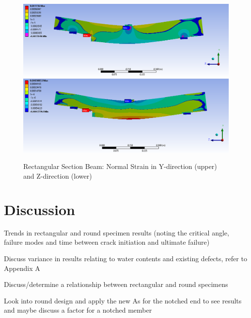 \documentclass[11pt,a4paper]{article}
\numberwithin{equation}{subsection}
\begin{document}
\begin{figure}[h]
	\begin{center}
		\includegraphics[scale=0.45]{y_normal_strain}
		\includegraphics[scale=0.45]{z_normal_strain}
	\end{center}
	\caption{Rectangular Section Beam: Normal Strain in Y-direction (upper) and Z-direction (lower)}
	\label{fig:fig:y_norm}
\end{figure}
\pagebreak
\vspace*{\baselineskip}  


\section{Discussion}

\vspace*{\baselineskip}
\noindent Trends in rectangular and round specimen results (noting the critical angle, failure modes and time between crack initiation and ultimate failure) \par

\vspace*{\baselineskip}
\noindent Discuss variance in results relating to water contents and existing defects, refer to Appendix A \par

\vspace*{\baselineskip}
\noindent Discuss/determine a relationship between rectangular and round specimens\par

\vspace*{\baselineskip}
\noindent Look into round design and apply the new As for the notched end to see results and maybe discuss a factor for a notched member\par
\end{document}
